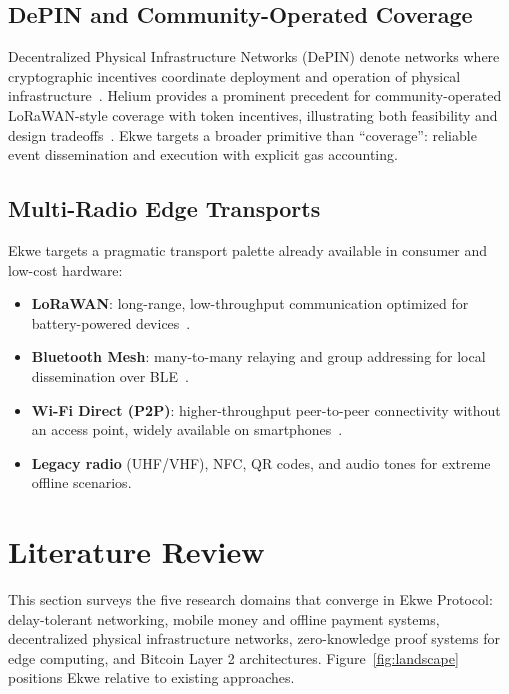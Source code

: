 \documentclass[11pt,a4paper]{article}
\begin{document}
\subsection{DePIN and Community-Operated Coverage}

Decentralized Physical Infrastructure Networks (DePIN) denote networks where cryptographic incentives coordinate deployment and operation of physical infrastructure~\cite{messari_depin}. Helium provides a prominent precedent for community-operated LoRaWAN-style coverage with token incentives, illustrating both feasibility and design tradeoffs~\cite{helium}. Ekwe targets a broader primitive than ``coverage'': reliable event dissemination and execution with explicit gas accounting.

\subsection{Multi-Radio Edge Transports}

Ekwe targets a pragmatic transport palette already available in consumer and low-cost hardware:
\begin{itemize}[nosep]
  \item \textbf{LoRaWAN}: long-range, low-throughput communication optimized for battery-powered devices~\cite{lorawan}.
  \item \textbf{Bluetooth Mesh}: many-to-many relaying and group addressing for local dissemination over BLE~\cite{bt_mesh}.
  \item \textbf{Wi-Fi Direct (P2P)}: higher-throughput peer-to-peer connectivity without an access point, widely available on smartphones~\cite{wifi_p2p}.
  \item \textbf{Legacy radio} (UHF/VHF), NFC, QR codes, and audio tones for extreme offline scenarios.
\end{itemize}

\section{Literature Review}

This section surveys the five research domains that converge in Ekwe Protocol: delay-tolerant networking, mobile money and offline payment systems, decentralized physical infrastructure networks, zero-knowledge proof systems for edge computing, and Bitcoin Layer 2 architectures. Figure~\ref{fig:landscape} positions Ekwe relative to existing approaches.
\end{document}
